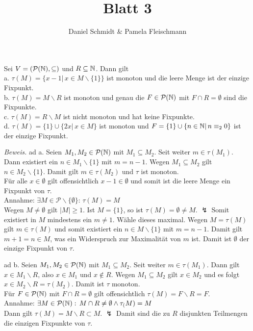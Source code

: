 \documentclass[12pt,a4paper]{amsart}
\begin{document}
\title{Blatt 3}

\author{Daniel Schmidt \& Pamela Fleischmann}

\maketitle

\begin{aufgabe1}
Sei $V=(\mathcal{P}(\mathbb{N}),\subseteq)$ und $R\subseteq\mathbb{N}$. Dann gilt\\
a. $\tau(M)=\{x-1|\,x\in M\backslash\{1\}\}$ ist monoton und die leere Menge ist der einzige Fixpunkt.\\
b. $\tau(M)=M\backslash R$ ist monoton und genau die $F\in\mathcal{P}(\mathbb{N})$ mit $F\cap R=\emptyset$ sind die Fixpunkte.\\
c. $\tau(M)=R\backslash M$ ist nicht monoton und hat keine Fixpunkte.\\
d. $\tau(M)=\{1\}\cup\{2x|\,x\in M\}$ ist monoton und $F=\{1\}\cup\{n\in\mathbb{N}|\,n\equiv_20\}$ ist der einzige Fixpunkt.
\end{aufgabe1}

\medskip

{\em Beweis.}
ad a. Seien $M_1,M_2\in\mathcal{P}(\mathbb{N})$ mit $M_1\subseteq M_2$. Seit weiter $m\in\tau(M_1)$. Dann existiert ein $n\in M_1\backslash\{1\}$ mit
$m=n-1$. Wegen $M_1\subseteq M_2$ gilt $n\in M_2\backslash\{1\}$. Damit gilt $m\in\tau(M_2)$ und $\tau$ ist monoton.\\
Für alle $x\in\emptyset$ gilt offensichtlich $x-1\in\emptyset$ und somit ist die leere Menge ein Fixpunkt von $\tau$.\\
Annahme: $\exists M\in\mathcal{P}\backslash\{\emptyset\}:\,\tau(M)=M$\\
Wegen $M\neq\emptyset$ gilt $|M|\geq 1$. Ist $M=\{1\}$, so ist $\tau(M)=\emptyset\neq M$. $\lightning$ Somit existiert in $M$ mindestens ein $m\neq 1$. Wähle
dieses maximal. Wegen $M=\tau(M)$ gilt $m\in\tau(M)$ und somit existiert ein $n\in M\backslash\{1\}$ mit $m=n-1$. Damit gilt $m+1=n\in M$, was ein Widerspruch zur
Maximalität von $m$ ist. Damit ist $\emptyset$ der einzige Fixpunkt von $\tau$.

\medskip

ad b. Seien $M_1,M_2\in\mathcal{P}(\mathbb{N})$ mit $M_1\subseteq M_2$. Seit weiter $m\in\tau(M_1)$. Dann gilt $x\in M_1\backslash R$, also $x\in M_1$ und $x\not\in R$.
Wegen $M_1\subseteq M_2$ gilt $x\in M_2$ und es folgt $x\in M_2\backslash R=\tau(M_2)$. Damit ist $\tau$ monoton.\\
Für $F\in\mathcal{P}(\mathbb{N})$ mit $F\cap R=\emptyset$ gilt offensichtlich $\tau(M)=F\backslash R =F$. \\
Annahme: $\exists M\in\mathcal{P}(\mathbb{N}):\,M\cap R\neq\emptyset\land \tau_(M)=M$\\
Dann gilt $\tau(M)=M\backslash R\subset M$. $\lightning$ Damit sind die zu $R$ disjunkten Teilmengen die einzigen Fixpunkte von $\tau$.
\end{document}
